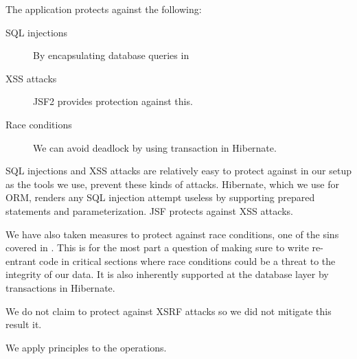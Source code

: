 \documentclass[a4paper]{article}
\begin{document}
The application protects against the following:
\begin{description}
\item[SQL injections] By encapsulating database queries in 
\item[XSS attacks] JSF2 provides protection against this.
\item[Race conditions] We can avoid deadlock by using transaction in Hibernate.
\end{description}
SQL injections and XSS attacks are relatively easy to protect against in our setup as the tools we use, prevent these kinds of attacks. Hibernate, which we use for ORM, renders any SQL injection attempt useless by supporting prepared statements and parameterization. JSF protects against XSS attacks.

We have also taken measures to protect against race conditions, one of the sins covered in \cite{sins2009}. This is for the most part a question of making sure to write re-entrant code in critical sections where race conditions could be a threat to the integrity of our data. It is also inherently supported at the database layer by transactions in Hibernate.


We do not claim to protect against XSRF attacks so we did not mitigate this result it.



We apply principles\cite{princ} to the operations.
\end{document}
